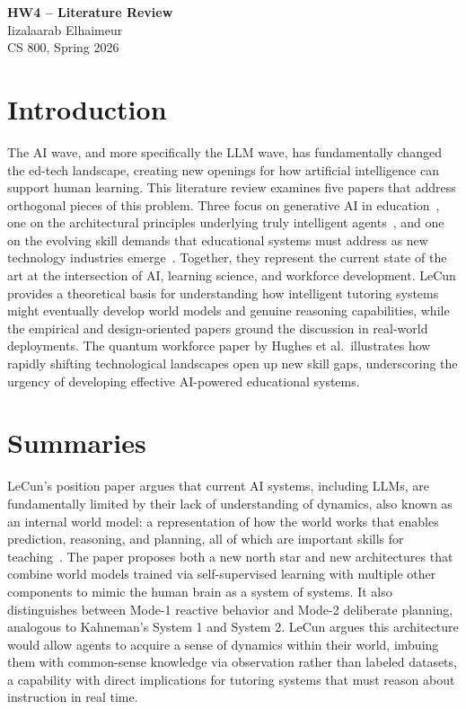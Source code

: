\documentclass[12pt]{article}
\begin{document}
\begin{centering}
{\large\textbf{HW4 -- Literature Review}}\\
\vspace{3mm}
Iizalaarab Elhaimeur\\
CS 800, Spring 2026\\
\end{centering}

\section{Introduction}

The AI wave, and more specifically the LLM wave, has fundamentally changed the ed-tech landscape, creating new openings for how artificial intelligence can support human learning. This literature review examines five papers that address orthogonal pieces of this problem. Three focus on generative AI in education~\cite{bastani2024generative, giannakos2024promise, wang2025genmentor}, one on the architectural principles underlying truly intelligent agents~\cite{lecun2022path}, and one on the evolving skill demands that educational systems must address as new technology industries emerge~\cite{hughes2022assessing}. Together, they represent the current state of the art at the intersection of AI, learning science, and workforce development. LeCun provides a theoretical basis for understanding how intelligent tutoring systems might eventually develop world models and genuine reasoning capabilities, while the empirical and design-oriented papers ground the discussion in real-world deployments. The quantum workforce paper by Hughes et al.\ illustrates how rapidly shifting technological landscapes open up new skill gaps, underscoring the urgency of developing effective AI-powered educational systems.

\section{Summaries}

LeCun's position paper argues that current AI systems, including LLMs, are fundamentally limited by their lack of understanding of dynamics, also known as an internal world model: a representation of how the world works that enables prediction, reasoning, and planning, all of which are important skills for teaching~\cite{lecun2022path}. The paper proposes both a new north star and new architectures that combine world models trained via self-supervised learning with multiple other components to mimic the human brain as a system of systems. It also distinguishes between Mode-1 reactive behavior and Mode-2 deliberate planning, analogous to Kahneman's System 1 and System 2. LeCun argues this architecture would allow agents to acquire a sense of dynamics within their world, imbuing them with common-sense knowledge via observation rather than labeled datasets, a capability with direct implications for tutoring systems that must reason about instruction in real time.
\end{document}
